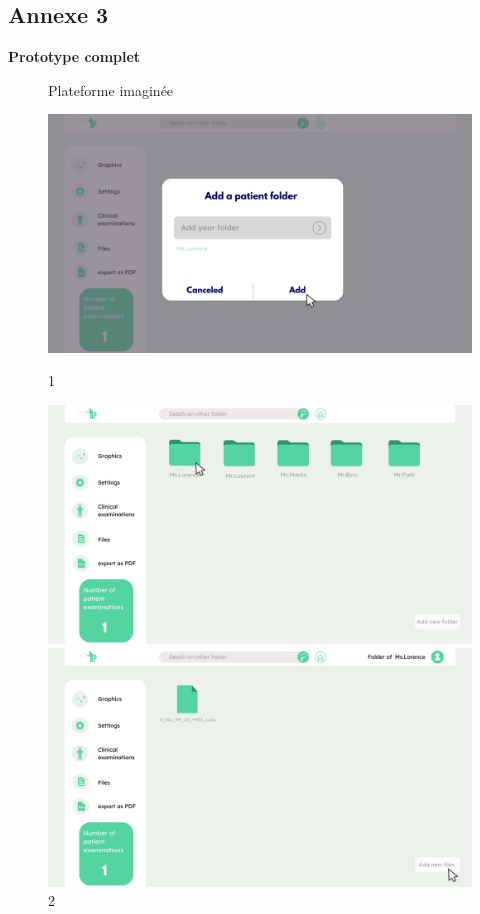 \newpage
\subsection{Annexe 3}

\textbf{Prototype complet}\\


\begin{figure}[H]
    \centering
    \caption{Plateforme imaginée}
    \begin{minipage}{0.3\textwidth}
        \centering
        \includegraphics[width=\textwidth]{images/Prototype/1.png}
        \caption*{1}
    \end{minipage}
    \begin{minipage}{0.3\textwidth}
        \centering
        \includegraphics[width=\textwidth]{images/Prototype/Accueil de la plateforme de visualisation.png}
        \caption*{2}
    \end{minipage}
    \begin{minipage}{0.3\textwidth}
        \centering
        \includegraphics[width=\textwidth]{images/Prototype/3.png}

\end{minipage}
\end{figure}
